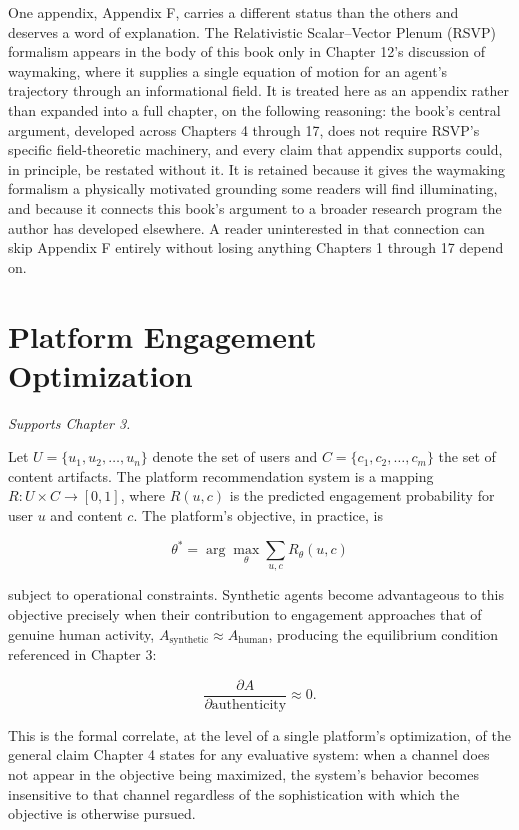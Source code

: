 \documentclass[12pt,a4paper]{book}
\begin{document}
One appendix, Appendix F, carries a different status than the others and deserves a word of explanation. The Relativistic Scalar--Vector Plenum (RSVP) formalism appears in the body of this book only in Chapter 12's discussion of waymaking, where it supplies a single equation of motion for an agent's trajectory through an informational field. It is treated here as an appendix rather than expanded into a full chapter, on the following reasoning: the book's central argument, developed across Chapters 4 through 17, does not require RSVP's specific field-theoretic machinery, and every claim that appendix supports could, in principle, be restated without it. It is retained because it gives the waymaking formalism a physically motivated grounding some readers will find illuminating, and because it connects this book's argument to a broader research program the author has developed elsewhere. A reader uninterested in that connection can skip Appendix F entirely without losing anything Chapters 1 through 17 depend on.


\chapter{Platform Engagement Optimization}
\label{app:engagement}

\emph{Supports Chapter 3.}

Let $U = \{u_1, u_2, \ldots, u_n\}$ denote the set of users and $C = \{c_1, c_2, \ldots, c_m\}$ the set of content artifacts. The platform recommendation system is a mapping $R: U \times C \to [0,1]$, where $R(u,c)$ is the predicted engagement probability for user $u$ and content $c$. The platform's objective, in practice, is

\[
\theta^* = \arg\max_\theta \sum_{u,c} R_\theta(u,c)
\]

subject to operational constraints. Synthetic agents become advantageous to this objective precisely when their contribution to engagement approaches that of genuine human activity, $A_{\mathrm{synthetic}} \approx A_{\mathrm{human}}$, producing the equilibrium condition referenced in Chapter 3:

\[
\frac{\partial A}{\partial \text{authenticity}} \approx 0.
\]

This is the formal correlate, at the level of a single platform's optimization, of the general claim Chapter 4 states for any evaluative system: when a channel does not appear in the objective being maximized, the system's behavior becomes insensitive to that channel regardless of the sophistication with which the objective is otherwise pursued.
\end{document}
